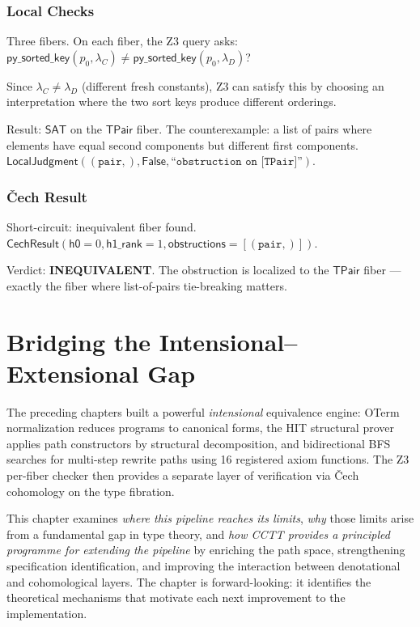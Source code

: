 \documentclass[11pt,a4paper]{report}
\theoremstyle{definition}
\theoremstyle{plain}
\begin{document}
\subsection{Local Checks}

Three fibers.  On each fiber, the Z3 query asks:
$\mathsf{py\_sorted\_key}(p_0, \lambda_C) \neq
\mathsf{py\_sorted\_key}(p_0, \lambda_D)$?

Since $\lambda_C \neq \lambda_D$ (different fresh constants),
Z3 can satisfy this by choosing an interpretation where the two
sort keys produce different orderings.

Result: $\mathsf{SAT}$ on the $\mathsf{TPair}$ fiber.
The counterexample: a list of pairs where elements have equal
second components but different first components.
$\mathsf{LocalJudgment}((\texttt{pair},), \mathsf{False},
\texttt{``obstruction on [TPair]''})$.

\subsection{\v{C}ech Result}

Short-circuit: inequivalent fiber found.
$\mathsf{CechResult}(\mathsf{h0} = 0, \mathsf{h1\_rank} = 1,
\mathsf{obstructions} = [(\texttt{pair},)])$.

Verdict: \textbf{INEQUIVALENT}.  The obstruction is localized to
the $\mathsf{TPair}$ fiber --- exactly the fiber where list-of-pairs
tie-breaking matters.


\chapter{Bridging the Intensional--Extensional Gap}
\label{ch:fallback}

The preceding chapters built a powerful \emph{intensional}
equivalence engine: OTerm normalization reduces programs to canonical
forms, the HIT structural prover applies path constructors by
structural decomposition, and bidirectional BFS searches for
multi-step rewrite paths using 16 registered axiom functions.
The Z3 per-fiber checker then provides a separate layer of
verification via \v{C}ech cohomology on the type fibration.

This chapter examines \emph{where this pipeline reaches its limits},
\emph{why} those limits arise from a fundamental gap in type theory,
and \emph{how CCTT provides a principled programme for extending the
pipeline} by enriching the path space, strengthening specification
identification, and improving the interaction between denotational
and cohomological layers.  The chapter is forward-looking: it
identifies the theoretical mechanisms that motivate each next
improvement to the implementation.
\end{document}
